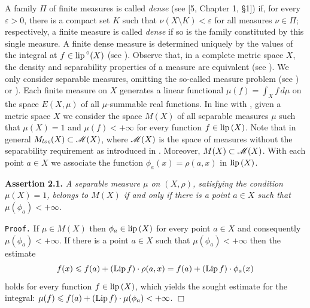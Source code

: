 \documentclass[11pt,a4paper]{article}
\begin{document}
A family $\Pi$ of finite measures is called \emph{dense} (see [5, Chapter 1, \S 1]) if, for every $\varepsilon>0$, there
is a compact set $K$ such that $\nu (X\setminus K)<\varepsilon$ for all measures $\nu\in\Pi$;
respectively, a finite measure is called \emph{dense}
if so is the family constituted by this single measure. A finite dense measure is determined
uniquely by the values of the integral at $f\in{\rm lip\,}^{\circ}(X)$
(see \cite[5, Chapter 1, \S 1, Theorem 1.3]{Bl}).
Observe that, in a complete metric space $X$, the density
and separability properties of a measure are equivalent
(see \cite[Supplement III]{Bl}).
We only consider separable measures, omitting the so-called
measure problem (see \cite[Supplement III]{Bl}) or \cite[2.1.6]{Fd}).
Each finite measure on $X$ generates a linear functional
$\mu(f)=\int_X f\,d\mu$ on the space $E(X,\mu)$
of all $\mu$-summable real functions.
In line with \cite[p. 159]{Ak}, given a metric space $X$
we consider the space $M(X)$ of all separable measures $\mu$ such that $\mu(X)=1$ and $\mu(f)<+\infty$ for every
function $f\in{\rm lip\,}(X)$. Note that in general $M_{loc}(X)\subset {\cal M}(X)$,
where ${\cal M}(X)$ is the space of measures
without the separability requirement as introduced in \cite[p. 160]{Ak}.
Moreover, ${M(X)\subset {\cal M}(X)}$.
With each point $a\in X$ we associate the function
${\phi_a(x)=\rho(a,x)}$ in ${\rm lip\,}(X)$.

\vspace{1em}

{\bf Assertion 2.1.} \sl %
 A separable measure $\mu$ on $(X,\rho)$, satisfying the condition $\mu(X)=1$, belongs
to $M(X)$ if and only if there is a point $a\in X$ such that $\mu(\phi_{a})<+\infty$. \rm

{\tt Proof.}
If $\mu\in M(X)$ then $\phi_a\in{\rm lip\,}(X)$ for every point $a\in X$ and consequently $\mu(\phi_{a})<+\infty$.
If there is a point $a\in X$ such that $\mu(\phi_{a})<+\infty$
then the estimate
$$f(x)\leqslant f(a)+({\rm Lip\,} f)\cdot\rho(a,x)=f(a)+({\rm Lip\,} f)\cdot \phi_a(x)$$
holds for every function $f\in{\rm lip\,}(X)$,
which yields the sought estimate for the integral:
$\mu(f)\leqslant f(a)+({\rm Lip\,} f)\cdot \mu(\phi_a)< +\infty$.
\hbox{$\Box$}
\end{document}
